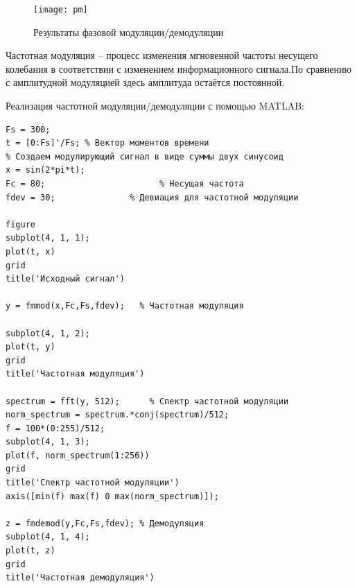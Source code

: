 \documentclass[10pt,a4paper]{article}
\begin{document}
\begin{figure}[h]\centering
	\texttt{[image: pm]}
	\caption{Результаты фазовой модуляции/демодуляции}\label{fig.pm}
\end{figure}                                                                                                                                                                                                                                                                                                                                                                                                                                                                                                                                                                                                                                                                                                                                                                                                                                                                                                                                                                                                                                                                                                                                                                                                                                                                                                                                                                                                                                                                        
\FloatBarrier

Частотная модуляция – процесс изменения мгновенной частоты несущего колебания в соответствии с изменением информационного сигнала.По сравнению с амплитудной модуляцией здесь амплитуда остаётся постоянной.

Реализация частотной модуляции/демодуляции с помощью MATLAB:
\begin{verbatim}
Fs = 300;
t = [0:Fs]'/Fs; % Вектор моментов времени
% Создаем модулирующий сигнал в виде суммы двух синусоид
x = sin(2*pi*t);
Fc = 80;                       % Несущая частота 
fdev = 30;               % Девиация для частотной модуляции

figure
subplot(4, 1, 1);
plot(t, x)
grid
title('Исходный сигнал')

y = fmmod(x,Fc,Fs,fdev);   % Частотная модуляция

subplot(4, 1, 2);
plot(t, y)
grid
title('Частотная модуляция')

spectrum = fft(y, 512);      % Спектр частотной модуляции
norm_spectrum = spectrum.*conj(spectrum)/512;
f = 100*(0:255)/512;
subplot(4, 1, 3);
plot(f, norm_spectrum(1:256))
grid
title('Спектр частотной модуляции')
axis([min(f) max(f) 0 max(norm_spectrum)]);

z = fmdemod(y,Fc,Fs,fdev); % Демодуляция
subplot(4, 1, 4);
plot(t, z)
grid
title('Частотная демодуляция')


\end{verbatim}
\end{document}
